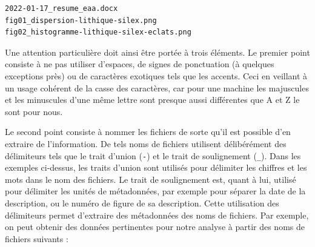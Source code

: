 \documentclass[
  french,
]{scrbook}
\begin{document}
\begin{verbatim}
2022-01-17_resume_eaa.docx
fig01_dispersion-lithique-silex.png
fig02_histogramme-lithique-silex-eclats.png
\end{verbatim}

Une attention particulière doit ainsi être portée à trois éléments. Le premier point consiste à ne pas utiliser d'espaces, de signes de ponctuation (à quelques exceptions près) ou de caractères exotiques tels que les accents. Ceci en veillant à un usage cohérent de la casse des caractères, car pour une machine les majuscules et les minuscules d'une même lettre sont presque aussi différentes que A et Z le sont pour nous.

Le second point consiste à nommer les fichiers de sorte qu'il est possible d'en extraire de l'information. De tels noms de fichiers utilisent délibérément des délimiteurs tels que le trait d'union (\texttt{-}) et le trait de soulignement (\texttt{\_}). Dans les exemples ci-dessus, les traits d'union sont utilisés pour délimiter les chiffres et les mots dans le nom des fichiers. Le trait de soulignement est, quant à lui, utilisé pour délimiter les unités de métadonnées, par exemple pour séparer la date de la description, ou le numéro de figure de sa description. Cette utilisation des délimiteurs permet d'extraire des métadonnées des noms de fichiers. Par exemple, on peut obtenir des données pertinentes pour notre analyse à partir des noms de fichiers suivants :
\end{document}
